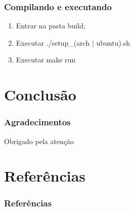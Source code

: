 \documentclass[12pt]{beamer}
\begin{document}
\begin{frame}
    \frametitle{Compilando e executando}
    \begin{enumerate}
        \item Entrar na pasta build;
        \item Executar ./setup\_(arch $|$ ubuntu).sh
        \item Executar make run
    \end{enumerate}
\end{frame}

\section{Conclusão}
\begin{frame}
    \frametitle{Agradecimentos}
    \centering
    \Huge{Obrigado pela atenção}
\end{frame}

\section{Referências}\label{Referências}
\begin{frame}[allowframebreaks]
    \frametitle{Referências} 
    
\end{frame}
\end{document}
